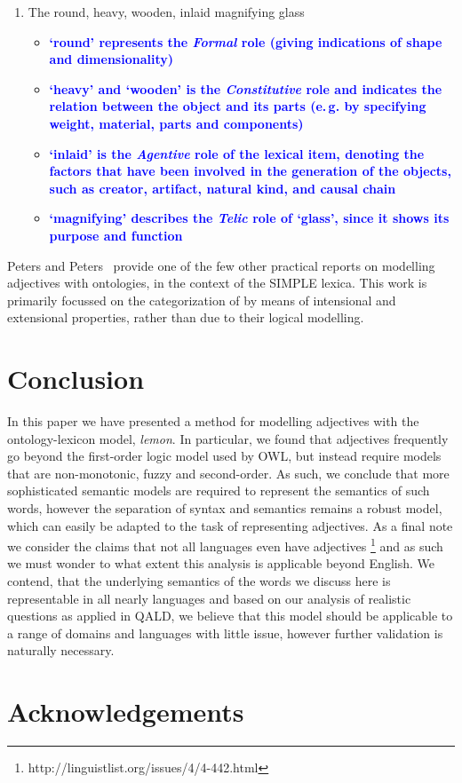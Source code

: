 \documentclass[11pt]{article}
\begin{document}
\begin{enumerate}[resume]
\item The round, heavy, wooden, inlaid magnifying glass \label{ex:qualia}
\begin{itemize}
\item \textbf{\textcolor{blue}{`round' represents the \textit{Formal} role (giving indications of shape and dimensionality)}}
\item \textbf{\textcolor{blue}{`heavy' and `wooden' is the \textit{Constitutive} role and indicates the relation between the object and its parts (e.\,g. by specifying weight, material, parts and components)}}
\item \textbf{\textcolor{blue}{`inlaid' is the \textit{Agentive} role of the lexical item, denoting the factors that have been involved in the generation of the objects, such as creator, artifact, natural kind, and causal chain}}
\item \textbf{\textcolor{blue}{`magnifying' describes the \textit{Telic} role of `glass', since it shows its purpose and function}}
\end{itemize}
\end{enumerate}



Peters and Peters~ provide one of the few other practical reports on modelling adjectives with ontologies, in the context of the SIMPLE lexica. This work is primarily focussed on the categorization of by means of intensional and extensional properties, rather than due to their logical modelling. 

\section{Conclusion}

In this paper we have presented a method for modelling adjectives with the
ontology-lexicon model, \emph{lemon}. In particular, we found that adjectives
frequently go beyond the first-order logic model used by OWL, but instead 
require models that are non-monotonic, fuzzy and second-order. As such, we 
conclude that more sophisticated semantic models are required to represent the semantics
of such words, however the separation of syntax and semantics remains a robust
model, which can easily be adapted to the task of representing adjectives. As 
a final note we consider the claims that not all languages even have adjectives
\footnote{http://linguistlist.org/issues/4/4-442.html} and as such we must wonder to what extent this analysis is applicable
beyond English. We contend, that the underlying semantics of the words we discuss here
is representable in all nearly languages and based on our analysis of realistic
questions as applied in QALD, we believe that this model should be applicable
to a range of domains and languages with little issue, however further 
validation is naturally necessary.

\section*{Acknowledgements}



\end{document}
